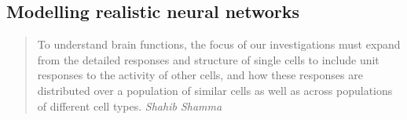 \subsection{Modelling realistic neural networks}\label{Ch1:ModellingIntro}

\begin{quote}
  To understand brain functions, the focus of our investigations must
  expand from the detailed responses and structure of single cells to
  include unit responses to the activity of other cells, and how these
  responses are distributed over a population of similar cells as well
  as across populations of different cell types.  \it{Shahib Shamma}
\end{quote}
















